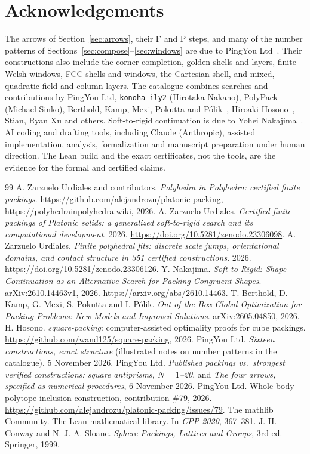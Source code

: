 \documentclass[11pt,a4paper]{article}
\newcommand{\code}[1]{\texttt{\nolinkurl{#1}}}
\theoremstyle{definition}
\theoremstyle{remark}
\begin{document}
\section*{Acknowledgements}
The arrows of Section~\ref{sec:arrows}, their F and P steps, and many of the number patterns of Sections~\ref{sec:compose}--\ref{sec:windows} are due to PingYou Ltd~\cite{pingSixteen,pingArrows}. Their constructions also include the corner completion, golden shells and layers, finite Welsh windows, FCC shells and windows, the Cartesian shell, and mixed, quadratic-field and column layers. The catalogue combines searches and contributions by PingYou Ltd, \code{konoha-ily2} (Hirotaka Nakano), PolyPack (Michael Sinko), Berthold, Kamp, Mexi, Pokutta and P\'olik~\cite{berthold2026}, Hiroaki Hosono~\cite{hosono}, Stian, Ryan Xu and others. Soft-to-rigid continuation is due to Yohei Nakajima~\cite{nakajima2026}. AI coding and drafting tools, including Claude (Anthropic), assisted implementation, analysis, formalization and manuscript preparation under human direction. The Lean build and the exact certificates, not the tools, are the evidence for the formal and certified claims.

\begin{thebibliography}{99}
 A. Zarzuelo Urdiales and contributors. \emph{Polyhedra in Polyhedra: certified finite packings}. \url{https://github.com/alejandrozu/platonic-packing}, \url{https://polyhedrainpolyhedra.wiki}, 2026.
 A. Zarzuelo Urdiales. \emph{Certified finite packings of Platonic solids: a generalized soft-to-rigid search and its computational development}. 2026. \url{https://doi.org/10.5281/zenodo.23306098}.
 A. Zarzuelo Urdiales. \emph{Finite polyhedral fits: discrete scale jumps, orientational domains, and contact structure in 351 certified constructions}. 2026. \url{https://doi.org/10.5281/zenodo.23306126}.
 Y. Nakajima. \emph{Soft-to-Rigid: Shape Continuation as an Alternative Search for Packing Congruent Shapes}. arXiv:2610.14463v1, 2026. \url{https://arxiv.org/abs/2610.14463}.
 T. Berthold, D. Kamp, G. Mexi, S. Pokutta and I. P\'olik. \emph{Out-of-the-Box Global Optimization for Packing Problems: New Models and Improved Solutions}. arXiv:2605.04850, 2026.
 H. Hosono. \emph{square-packing}: computer-assisted optimality proofs for cube packings. \url{https://github.com/wand125/square-packing}, 2026.
 PingYou Ltd. \emph{Sixteen constructions, exact structure} (illustrated notes on number patterns in the catalogue), 5 November 2026.
 PingYou Ltd. \emph{Published packings vs.\ strongest verified constructions: square antiprisms, $N=1$--20}, and \emph{The four arrows, specified as numerical procedures}, 6 November 2026.
 PingYou Ltd. Whole-body polytope inclusion construction, contribution \#79, 2026. \url{https://github.com/alejandrozu/platonic-packing/issues/79}.
 The mathlib Community. The Lean mathematical library. In \emph{CPP 2020}, 367--381.
 J. H. Conway and N. J. A. Sloane. \emph{Sphere Packings, Lattices and Groups}, 3rd ed. Springer, 1999.
\end{thebibliography}
\end{document}
